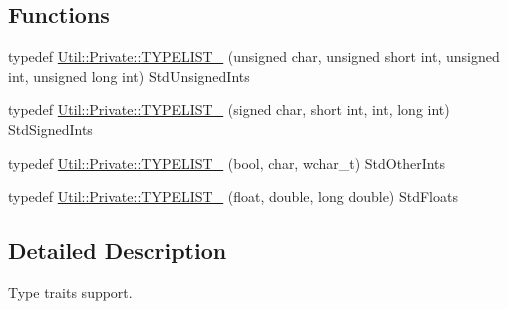 \subsection*{Functions}
\begin{DoxyCompactItemize}
\item 
typedef \mbox{\hyperlink{namespaceUtil_1_1Private_aa81b02b7963e37c42096312fa70d0791}{Util\+::\+Private\+::\+T\+Y\+P\+E\+L\+I\+S\+T\+\_}} (unsigned char, unsigned short int, unsigned int, unsigned long int) Std\+Unsigned\+Ints
\item 
typedef \mbox{\hyperlink{namespaceUtil_1_1Private_a19b1c2e5f4b1c1a580f117d4ca819b3e}{Util\+::\+Private\+::\+T\+Y\+P\+E\+L\+I\+S\+T\+\_}} (signed char, short int, int, long int) Std\+Signed\+Ints
\item 
typedef \mbox{\hyperlink{namespaceUtil_1_1Private_a3b8821ccc8b156ae11dc2d5852d47af0}{Util\+::\+Private\+::\+T\+Y\+P\+E\+L\+I\+S\+T\+\_}} (bool, char, wchar\+\_\+t) Std\+Other\+Ints
\item 
typedef \mbox{\hyperlink{namespaceUtil_1_1Private_a0b98bef9e8fd094726b49ae3ea04d81d}{Util\+::\+Private\+::\+T\+Y\+P\+E\+L\+I\+S\+T\+\_}} (float, double, long double) Std\+Floats
\end{DoxyCompactItemize}


\subsection{Detailed Description}
Type traits support. 

